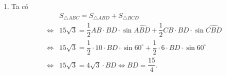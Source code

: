 \begin{bt}
{\begin{enumerate}
{\begin{tikzpicture}[>=stealth,line join=round,line cap=round,line width=0.6pt,font=\footnotesize]
				\end{tikzpicture}
			}
			\item  Ta có
			\allowdisplaybreaks
			\begin{eqnarray*}
				&&S_{\triangle ABC} = S_{\triangle ABD} + S_{\triangle BCD}\\ &\Leftrightarrow& 15\sqrt{3}=\dfrac{1}{2} AB \cdot BD \cdot \sin \widehat{ABD} +\dfrac{1}{2} CB \cdot BD \cdot \sin \widehat{CBD}\\
				&\Leftrightarrow& 15\sqrt{3}=\dfrac{1}{2}\cdot 10 \cdot BD \cdot \sin 60^\circ +\dfrac{1}{2} \cdot 6 \cdot BD \cdot \sin 60^\circ\\
				&\Leftrightarrow&15\sqrt{3}=4\sqrt{3}\cdot BD\Leftrightarrow BD= \dfrac{15}{4}.
			\end{eqnarray*}
	\end{enumerate}	}
\end{bt}

